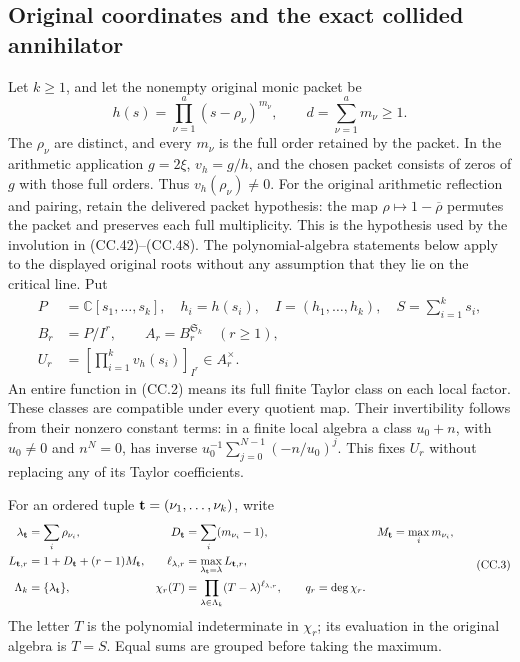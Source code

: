 \documentclass[11pt,a4paper]{article}
\begin{document}
\subsection{Original coordinates and the exact collided annihilator}

Let \(k\geq1\), and let the nonempty original monic packet be
\[
 h(s)=\prod_{\nu=1}^{a}(s-\rho_\nu)^{m_\nu},
 \qquad d=\sum_{\nu=1}^{a}m_\nu\geq1.
 \tag{CC.1}
\]
The \(\rho_\nu\) are distinct, and every \(m_\nu\) is the full order
retained by the packet.  In the arithmetic application
\(g=2\xi\), \(v_h=g/h\), and the chosen packet consists of zeros of
\(g\) with those full orders.  Thus \(v_h(\rho_\nu)\ne0\).
For the original arithmetic reflection and pairing, retain the
delivered packet hypothesis: the map
\(\rho\mapsto1-\overline\rho\) permutes the packet and preserves
each full multiplicity.  This is the hypothesis used by the
involution in (CC.42)--(CC.48).
The polynomial-algebra statements below apply to the displayed original
roots without any assumption that they lie on the critical line.
Put
\[
\begin{aligned}
 P&=\mathbb C[s_1,\ldots,s_k],\quad h_i=h(s_i),\quad I=(h_1,\ldots,h_k),
 \quad S=\sum_{i=1}^k s_i,\\
 B_r&=P/I^r,\qquad A_r=B_r^{\mathfrak S_k}\quad(r\geq1),\\
 U_r&=\left[\prod_{i=1}^k v_h(s_i)\right]_{I^r}\in A_r^\times .
\end{aligned}
\tag{CC.2}
\]
An entire function in (CC.2) means its full finite Taylor class on
each local factor.  These classes are compatible under every quotient
map.  Their invertibility follows from their nonzero constant terms:
in a finite local algebra a class \(u_0+n\), with \(u_0\ne0\) and
\(n^N=0\), has inverse
\(u_0^{-1}\sum_{j=0}^{N-1}(-n/u_0)^j\).
This fixes \(U_r\) without replacing any of its Taylor coefficients.

For an ordered tuple \({\bf t}=(\nu_1,\ldots,\nu_k)\), write
\[
\begin{aligned}
 \lambda_{\bf t}&=\sum_i\rho_{\nu_i},&
 D_{\bf t}&=\sum_i(m_{\nu_i}-1),&
 M_{\bf t}&=\max_i m_{\nu_i},\\
 L_{{\bf t},r}&=1+D_{\bf t}+(r-1)M_{\bf t},&
 \ell_{\lambda,r}&=\max_{\lambda_{\bf t}=\lambda}L_{{\bf t},r},\\
 \Lambda_k&=\{\lambda_{\bf t}\},&
 \chi_r(T)&=\prod_{\lambda\in\Lambda_k}(T-\lambda)^{\ell_{\lambda,r}},
 \qquad q_r=\deg\chi_r .
\end{aligned}
\tag{CC.3}
\]
The letter \(T\) is the polynomial indeterminate in \(\chi_r\);
its evaluation in the original algebra is \(T=S\).
Equal sums are grouped before taking the maximum.
\end{document}
